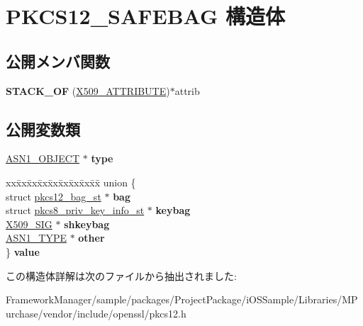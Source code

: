 \hypertarget{struct_p_k_c_s12___s_a_f_e_b_a_g}{}\section{P\+K\+C\+S12\+\_\+\+S\+A\+F\+E\+B\+A\+G 構造体}
\label{struct_p_k_c_s12___s_a_f_e_b_a_g}
\subsection*{公開メンバ関数}
\begin{DoxyCompactItemize}
\item 
\hypertarget{struct_p_k_c_s12___s_a_f_e_b_a_g_a36b65bc2ddacef551ca40bff5bc21d96}{}{\bfseries S\+T\+A\+C\+K\+\_\+\+O\+F} (\hyperlink{structx509__attributes__st}{X509\+\_\+\+A\+T\+T\+R\+I\+B\+U\+T\+E})$\ast$attrib\label{struct_p_k_c_s12___s_a_f_e_b_a_g_a36b65bc2ddacef551ca40bff5bc21d96}

\end{DoxyCompactItemize}
\subsection*{公開変数類}
\begin{DoxyCompactItemize}
\item 
\hypertarget{struct_p_k_c_s12___s_a_f_e_b_a_g_a7e25098bf7d75c05613960d6c9a0e554}{}\hyperlink{structasn1__object__st}{A\+S\+N1\+\_\+\+O\+B\+J\+E\+C\+T} $\ast$ {\bfseries type}\label{struct_p_k_c_s12___s_a_f_e_b_a_g_a7e25098bf7d75c05613960d6c9a0e554}

\item 
\hypertarget{struct_p_k_c_s12___s_a_f_e_b_a_g_a1b1634d92c24cb3e3d91532a5d072f0e}{}\begin{tabbing}
xx\=xx\=xx\=xx\=xx\=xx\=xx\=xx\=xx\=\kill
union \{\\
\>struct \hyperlink{structpkcs12__bag__st}{pkcs12\_bag\_st} $\ast$ {\bfseries bag}\\
\>struct \hyperlink{structpkcs8__priv__key__info__st}{pkcs8\_priv\_key\_info\_st} $\ast$ {\bfseries keybag}\\
\>\hyperlink{struct_x509__sig__st}{X509\_SIG} $\ast$ {\bfseries shkeybag}\\
\>\hyperlink{structasn1__type__st}{ASN1\_TYPE} $\ast$ {\bfseries other}\\
\} {\bfseries value}\label{struct_p_k_c_s12___s_a_f_e_b_a_g_a1b1634d92c24cb3e3d91532a5d072f0e}
\\

\end{tabbing}\end{DoxyCompactItemize}


この構造体詳解は次のファイルから抽出されました\+:\begin{DoxyCompactItemize}
\item 
Framework\+Manager/sample/packages/\+Project\+Package/i\+O\+S\+Sample/\+Libraries/\+M\+Purchase/vendor/include/openssl/pkcs12.\+h\end{DoxyCompactItemize}
